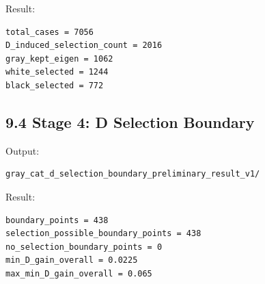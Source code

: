 \documentclass{article}
\begin{document}
Result:

\begin{verbatim}
total_cases = 7056
D_induced_selection_count = 2016
gray_kept_eigen = 1062
white_selected = 1244
black_selected = 772
\end{verbatim}

\subsection{9.4 Stage 4: D Selection
Boundary}\label{stage-4-d-selection-boundary}

Output:

\begin{verbatim}
gray_cat_d_selection_boundary_preliminary_result_v1/
\end{verbatim}

Result:

\begin{verbatim}
boundary_points = 438
selection_possible_boundary_points = 438
no_selection_boundary_points = 0
min_D_gain_overall = 0.0225
max_min_D_gain_overall = 0.065
\end{verbatim}
\end{document}
